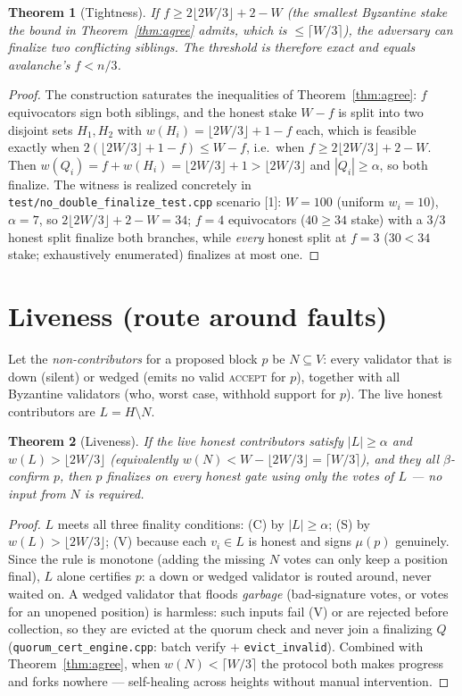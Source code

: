\documentclass[11pt]{article}
\newtheorem{theorem}{Theorem}
\begin{document}
\begin{theorem}[Tightness]\label{thm:tight}
If $f\ge 2\lfloor 2W/3\rfloor + 2 - W$ (the smallest Byzantine stake the bound in
Theorem~\ref{thm:agree} admits, which is $\le\lceil W/3\rceil$), the adversary
\emph{can} finalize two conflicting siblings. The threshold is therefore exact and
equals avalanche's $f<n/3$.
\end{theorem}
\begin{proof}
The construction saturates the inequalities of Theorem~\ref{thm:agree}: $f$
equivocators sign both siblings, and the honest stake $W-f$ is split into two
disjoint sets $H_1,H_2$ with $w(H_i)=\lfloor 2W/3\rfloor + 1 - f$ each, which is
feasible exactly when $2(\lfloor 2W/3\rfloor+1-f)\le W-f$, i.e.\ when
$f\ge 2\lfloor 2W/3\rfloor+2-W$. Then $w(Q_i)=f+w(H_i)=\lfloor 2W/3\rfloor+1>
\lfloor 2W/3\rfloor$ and $|Q_i|\ge\alpha$, so both finalize. The witness is realized
concretely in \texttt{test/no\_double\_finalize\_test.cpp} scenario [1]: $W=100$
(uniform $w_i=10$), $\alpha=7$, so $2\lfloor 2W/3\rfloor+2-W=34$; $f=4$ equivocators
($40\ge 34$ stake) with a $3/3$ honest split finalize both branches, while
\emph{every} honest split at $f=3$ ($30<34$ stake; exhaustively enumerated)
finalizes at most one.
\end{proof}

\section{Liveness (route around faults)}

Let the \emph{non-contributors} for a proposed block $p$ be $N\subseteq V$: every
validator that is down (silent) or wedged (emits no valid \textsc{accept} for $p$),
together with all Byzantine validators (who, worst case, withhold support for $p$).
The live honest contributors are $L=H\setminus N$.

\begin{theorem}[Liveness]\label{thm:live}
If the live honest contributors satisfy $|L|\ge\alpha$ and $w(L)>\lfloor 2W/3\rfloor$
(equivalently $w(N) < W-\lfloor 2W/3\rfloor=\lceil W/3\rceil$), and they all
$\beta$-confirm $p$, then $p$ finalizes on every honest gate using only the votes of
$L$ --- no input from $N$ is required.
\end{theorem}
\begin{proof}
$L$ meets all three finality conditions: (C) by $|L|\ge\alpha$; (S) by
$w(L)>\lfloor 2W/3\rfloor$; (V) because each $v_i\in L$ is honest and signs $\mu(p)$
genuinely. Since the rule is monotone (adding the missing $N$ votes can only keep a
position final), $L$ alone certifies $p$: a down or wedged validator is routed
around, never waited on. A wedged validator that floods \emph{garbage} (bad-signature
votes, or votes for an unopened position) is harmless: such inputs fail (V) or are
rejected before collection, so they are evicted at the quorum check and never join a
finalizing $Q$ (\texttt{quorum\_cert\_engine.cpp}: batch verify $+$
\texttt{evict\_invalid}). Combined with Theorem~\ref{thm:agree}, when
$w(N)<\lceil W/3\rceil$ the protocol both makes progress and forks nowhere ---
self-healing across heights without manual intervention.
\end{proof}
\end{document}
